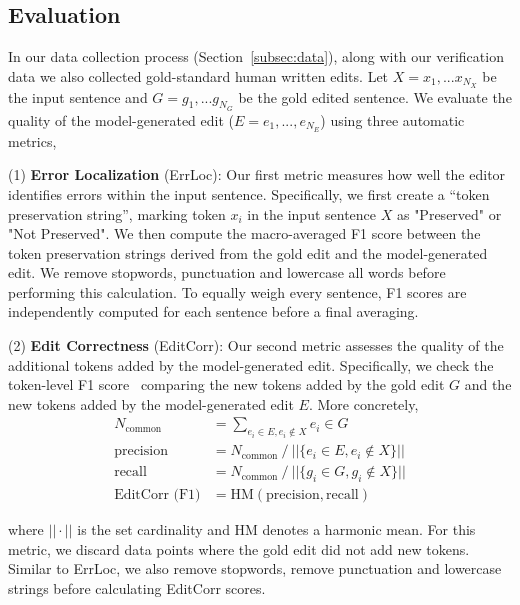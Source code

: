 \subsection{Evaluation}\label{subsubsec:editing-eval}

In our data collection process (Section~\ref{subsec:data}), along with our verification data we also collected gold-standard human written edits. Let $X = x_1,...x_{N_X}$ be the input sentence and $G = g_1,...g_{N_G}$ be the gold edited sentence.
We evaluate the quality of the model-generated edit ($E = e_1,...,e_{N_E}$) using three automatic metrics,

\vspace{0.3em}

\noindent (1) \textbf{Error Localization} (ErrLoc): Our first metric measures how well the editor identifies errors within the input sentence. Specifically, we first create a ``token preservation string'', marking token $x_i$ in the input sentence $X$ as "Preserved" or "Not Preserved". We then compute the macro-averaged F1 score between the token preservation strings derived from the gold edit and the model-generated edit. We remove stopwords, punctuation and lowercase all words before performing this calculation. To equally weigh every sentence, F1 scores are independently computed for each sentence before a final averaging.

\vspace{0.3em}

\noindent (2) \textbf{Edit Correctness} (EditCorr): Our second metric assesses the quality of the additional tokens added by the model-generated edit. Specifically, we check the token-level F1 score~\citep{rajpurkar2016squad} comparing the new tokens added by the gold edit $G$ and the new tokens added by the model-generated edit $E$. More concretely,
\begin{align*}
N_\text{common} &= \sum_{e_i \in E, e_i \notin X} e_i \in G \\
\text{precision} &= N_\text{common} ~/~ || \{e_i \in E, e_i \notin X\} || \\
\text{recall} &= N_\text{common} ~/~ || \{g_i \in G, g_i \notin X\} || \\
\text{EditCorr (F1)} &= \text{HM} (\text{precision}, \text{recall})
\end{align*}

where $||\cdot||$ is the set cardinality and HM denotes a harmonic mean. For this metric, we discard data points where the gold edit did not add new tokens. Similar to ErrLoc, we also remove stopwords, remove punctuation and lowercase strings before calculating EditCorr scores.


